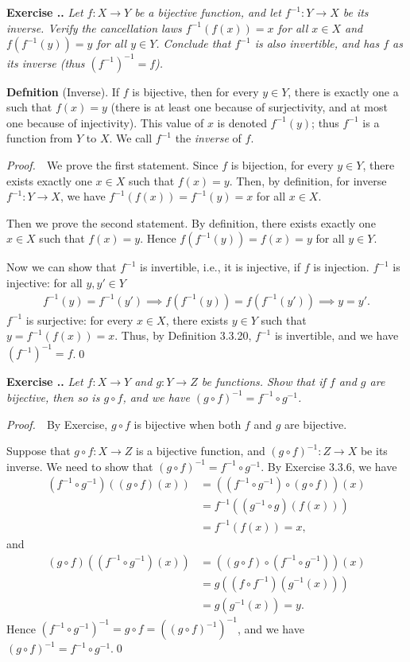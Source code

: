 \documentclass{book}
\newcommand{\pff}{\vspace{.25em}\noindent\emph{Proof.}~~}
\newcommand{\titl}[1]{\noindent\textbf{#1}}
\newcounter{Exercise}[section]
\renewcommand{\theExercise}{\thesection.\arabic{Exercise}.}
\newcommand{\new}{\vspace{1.5em}\noindent\textbf{{Exercise \stepcounter{Exercise}\textbf{\theExercise}}} }
\begin{document}
\new\emph{Let $f:X\to Y$ be a bijective function, and let $f^{-1}:Y\to X$ be its inverse. Verify the cancellation laws $f^{-1}(f(x))=x$ for all $x\in X$ and $f(f^{-1}(y))=y$ for all $y\in Y$. Conclude that $f^{-1}$ is also invertible, and has $f$ as its inverse (thus $(f^{-1})^{-1}=f$).}

\begin{framed}
\titl{Defnition} (Inverse). If $f$ is bijective, then for every $y\in Y$, there is exactly one a such that $f(x)=y$ (there is at least one because of surjectivity, and at most one because of injectivity). This value of $x$ is denoted $f^{-1}(y)$; thus $f^{-1}$ is a function from $Y$ to $X$. We call $f^{-1}$ the \emph{inverse} of $f$.
\end{framed}

\pff We prove the first statement. Since $f$ is bijection, for every $y\in Y$, there exists exactly one $x\in X$ such that $f(x)=y$. Then, by definition, for inverse $f^{-1}:Y\to X$, we have $f^{-1}(f(x))=f^{-1}(y)=x$ for all $x\in X$.

Then we prove the second statement. By definition, there exists exactly one $x\in X$ such that $f(x)=y$. Hence $f(f^{-1}(y))=f(x)=y$ for all $y\in Y$.

Now we can show that $f^{-1}$ is invertible, i.e., it is injective, if $f$ is injection. $f^{-1}$ is injective: for all $y,y'\in Y$
    \begin{align*}
        f^{-1}(y)=f^{-1}(y')\implies f(f^{-1}(y))=f(f^{-1}(y'))\implies y=y'.
    \end{align*}
$f^{-1}$ is surjective: for every $x\in X$, there exists $y\in Y$ such that $y=f^{-1}(f(x))=x$. Thus, by Definition 3.3.20, $f^{-1}$ is invertible, and we have $(f^{-1})^{-1}=f$.\qed

\new\emph{Let $f:X\to Y$ and $g:Y\to Z$ be functions. Show that if $f$ and $g$ are bijective, then so is $g\circ f$, and we have $(g\circ f)^{-1}=f^{-1}\circ g^{-1}$.}

\pff By Exercise, $g\circ f$ is bijective when both $f$ and $g$ are bijective.

Suppose that $g\circ f:X\to Z$ is a bijective function, and $(g\circ f)^{-1}:Z\to X$ be its inverse. We need to show that $(g\circ f)^{-1}=f^{-1}\circ g^{-1}$. By Exercise 3.3.6, we have
    \begin{align*}
        (f^{-1}\circ g^{-1})((g\circ f)(x))
        &=\left((f^{-1}\circ g^{-1})\circ(g\circ f)\right)(x)\\
        &=f^{-1}\left((g^{-1}\circ g)(f(x))\right)\\
        &=f^{-1}\left(f(x)\right)
        =x,
    \end{align*}
and
    \begin{align*}
        (g\circ f)\left((f^{-1}\circ g^{-1})(x)\right)
        &=\left((g\circ f)\circ(f^{-1}\circ g^{-1})\right)(x)\\
        &=g\left((f\circ f^{-1})(g^{-1}(x))\right)\\
        &=g\left(g^{-1}(x)\right)
        =y.
    \end{align*}
Hence $(f^{-1}\circ g^{-1})^{-1}=g\circ f=((g\circ f)^{-1})^{-1}$, and we have $(g\circ f)^{-1}=f^{-1}\circ g^{-1}$.\qed
\end{document}
